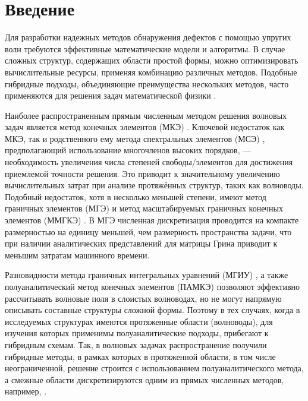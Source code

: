 \documentclass[press]{vestnik}
\begin{document}
\section*{Введение}
Для разработки надежных методов обнаружения дефектов с помощью упругих волн требуются эффективные математические модели и алгоритмы. В случае сложных структур, содержащих области простой формы, можно оптимизировать вычислительные ресурсы, применяя комбинацию различных методов. Подобные гибридные подходы, объединяющие преимущества нескольких методов, часто применяются для решения задач математической физики \cite{Burago,Lisitsa}.

Наиболее распространенным прямым численным методом решения волновых задач является метод конечных элементов (МКЭ) \cite{Lu}. Ключевой недостаток как МКЭ, так и родственного ему метода спектральных элементов (МСЭ) \cite{Komatitsch,Ostachowicz}, предполагающий использование многочленов высоких порядков, — необходимость увеличения числа степеней свободы/элементов для достижения приемлемой точности решения. Это приводит к значительному увеличению вычислительных затрат при анализе протяжённых структур, таких как волноводы. Подобный недостаток, хотя в несколько меньшей степени, имеют метод граничных элементов (МГЭ) \cite{Igumnov} и метод масштабируемых граничных конечных элементов (ММГКЭ) \cite{Song}. В МГЭ численная дискретизация проводится на компакте размерностью на единицу меньшей, чем размерность пространства задачи, что при наличии аналитических представлений для матрицы Грина приводит к меньшим затратам машинного времени.

Разновидности метода граничных интегральных уравнений (МГИУ) \cite{Babeshko,Vatulyan,Manolis}, а также полуаналитический метод конечных элементов (ПАМКЭ) \cite{Bartoli} позволяют эффективно рассчитывать волновые поля в слоистых волноводах, но не могут напрямую описывать составные структуры сложной формы. Поэтому в тех случаях, когда в исследуемых структурах имеются протяженные области (волноводы), для изучения которых применимы полуаналитические подходы, прибегают к гибридным схемам. Так, в волновых задачах распространение получили гибридные методы, в рамках которых в протяженной области, в том числе неограниченной, решение строится с использованием полуаналитического метода, а смежные области дискретизируются одним из прямых численных методов, например, \cite{Vivar-Perez,Zou,Glushkov,Golub_2019,Malik,Novikov,Vareldzhan}.
\end{document}
